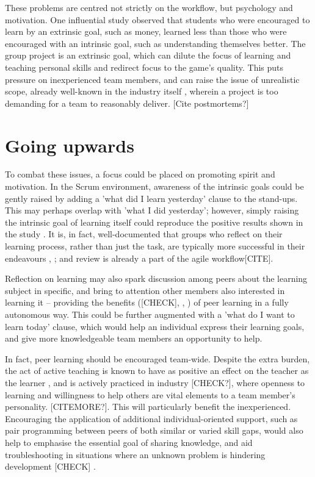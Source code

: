 \documentclass{scrartcl}
\begin{document}
These problems are centred not strictly on the workflow, but psychology and motivation. One influential study \cite{motivation} observed that students who were encouraged to learn by an extrinsic goal, such as money, learned less than those who were encouraged with an intrinsic goal, such as understanding themselves better. The group project is an extrinsic goal, which can dilute the focus of learning and teaching personal skills and redirect focus to the game's quality. This puts pressure on inexperienced team members, and can raise the issue of unrealistic scope, already well-known in the industry itself \cite{problems}, wherein a project is too demanding for a team to reasonably deliver. [Cite postmortems?]

\section{Going upwards}
To combat these issues, a focus could be placed on promoting spirit and motivation. In the Scrum environment, awareness of the intrinsic goals could be gently raised by adding a 'what did I learn yesterday' clause to the stand-ups. This may perhaps overlap with 'what I did yesterday'; however, simply raising the intrinsic goal of learning itself could reproduce the positive results shown in the study \cite{motivation}. It is, in fact, well-documented that groups who reflect on their learning process, rather than just the task, are typically more successful in their endeavours \cite{effectivegroups}, \cite{learningreflection}; and review is already a part of the agile workflow[CITE].

Reflection on learning may also spark discussion among peers about the learning subject in specific, and bring to attention other members also interested in learning it -- providing the benefits (\cite{collaboration}[CHECK], \cite{motivation}, \cite{group2005}) of peer learning in a fully autonomous way. This could be further augmented with a 'what do I want to learn today' clause, which would help an individual express their learning goals, and give more knowledgeable team members an opportunity to help.

In fact, peer learning should be encouraged team-wide. Despite the extra burden, the act of active teaching is known to have as positive an effect on the teacher as the learner \cite{activepassive}, and is actively practiced in industry \cite{devstudy}[CHECK?], where openness to learning \cite{devstudy} and willingness to help others \cite{collaboration} are vital elements to a team member's personality. [CITEMORE?]. This will particularly benefit the inexperienced. Encouraging the application of additional individual-oriented support, such as pair programming between peers of both similar or varied skill gaps, would also help to emphasise the essential goal of sharing knowledge, and aid troubleshooting in situations where an unknown problem is hindering development \cite{collaboration} [CHECK] \cite{motivation} \cite{devstudy}.
\end{document}
